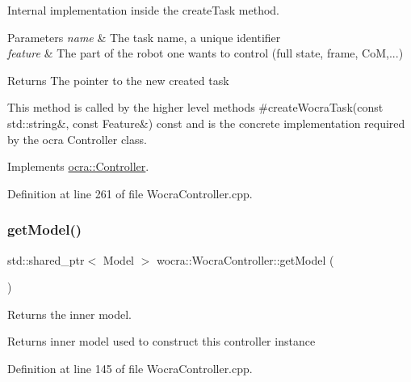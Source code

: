 Internal implementation inside the create\+Task method.


\begin{DoxyParams}{Parameters}
{\em name} & The task name, a unique identifier \\
\hline
{\em feature} & The part of the robot one wants to control (full state, frame, CoM,...) \\
\hline
\end{DoxyParams}
\begin{DoxyReturn}{Returns}
The pointer to the new created task
\end{DoxyReturn}
This method is called by the higher level methods \#create\+Wocra\+Task(const std\+::string\&, const Feature\&) const and is the concrete implementation required by the ocra Controller class. 

Implements \hyperlink{classocra_1_1Controller_a358a31c0b6b6bdcc0e6da5c49eb9fde5}{ocra\+::\+Controller}.



Definition at line 261 of file Wocra\+Controller.\+cpp.

\hypertarget{classwocra_1_1WocraController_adc7f78b5f888c76a3296cfd5882caad1}{}\label{classwocra_1_1WocraController_adc7f78b5f888c76a3296cfd5882caad1} 
\subsubsection{\texorpdfstring{get\+Model()}{getModel()}}
{\footnotesize\ttfamily std\+::shared\+\_\+ptr$<$ Model $>$ wocra\+::\+Wocra\+Controller\+::get\+Model (\begin{DoxyParamCaption}{ }\end{DoxyParamCaption})}

Returns the inner model.

\begin{DoxyReturn}{Returns}
inner model used to construct this controller instance 
\end{DoxyReturn}


Definition at line 145 of file Wocra\+Controller.\+cpp.

\hypertarget{classwocra_1_1WocraController_a4023613cae33e5f490babbc6d162204d}{}\label{classwocra_1_1WocraController_a4023613cae33e5f490babbc6d162204d} 
